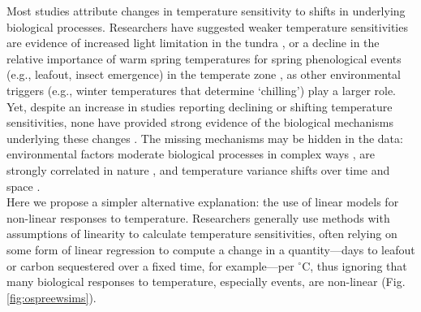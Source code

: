 \documentclass[11pt,letter]{article}
\begin{document}
Most studies attribute changes in temperature sensitivity to shifts in underlying biological processes. Researchers have suggested weaker temperature sensitivities are evidence of increased light limitation in the tundra \citep{piao2017}, or a decline in the relative importance of warm spring temperatures for spring phenological events (e.g., leafout, insect emergence) in the temperate zone \citep{fu2015,meng2020}, as other environmental triggers (e.g., winter temperatures that determine `chilling') play a larger role. Yet, despite an increase in studies reporting declining or shifting temperature sensitivities, none have provided strong evidence of the biological mechanisms underlying these changes  \citep[e.g.,][]{fu2015,meng2020}. The missing mechanisms may be hidden in the data: environmental factors moderate biological processes in complex ways \citep{chuine2016,gusewell2017}, are strongly correlated in nature \citep[e.g.,][]{fu2015}, and temperature variance shifts over time and space \citep{keenan2019}. \\

Here we propose a simpler alternative explanation: the use of linear models for non-linear responses to temperature. Researchers generally use methods with assumptions of linearity to calculate temperature sensitivities, often relying on some form of linear regression to compute a change in a quantity---days to leafout or carbon sequestered over a fixed time, for example---per $^{\circ}$C, thus ignoring that many biological responses to temperature, especially events, are non-linear (Fig. \ref{fig:ospreewsims}). \\ %
\end{document}

